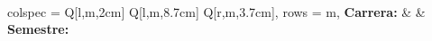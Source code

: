 



\begin{center}
\Large\titulo\\
\end{center}
\noindent
\large
\begin{tblr}{
  colspec = {Q[l,m,2cm] Q[l,m,8.7cm] Q[r,m,3.7cm]}, 
  rows = {m},  %
}
\textbf{Carrera:} & \carrera & \textbf{Semestre:} \semestre \\
\end{tblr}

\renewcommand{\arraystretch}{1.5}
\noindent
